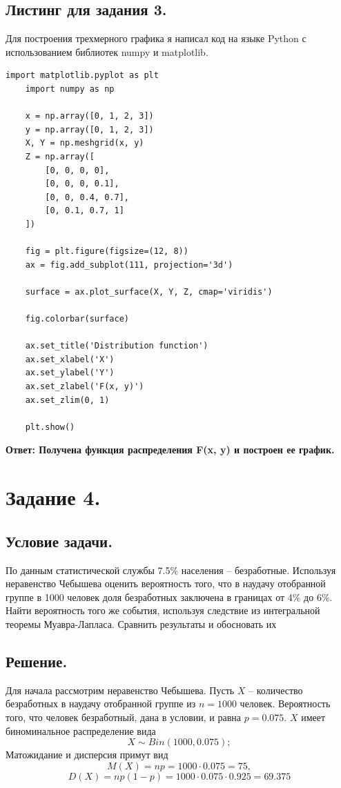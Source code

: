 \documentclass[a4paper, 12pt]{article}
\begin{document}
    \subsection{Листинг для задания 3.}
    Для построения трехмерного графика я написал код на языке Python с использованием библиотек
    numpy и matplotlib.
    \begin{lstlisting}[label=code, caption=Программа для построения трехмерного графика.]
    import matplotlib.pyplot as plt
    import numpy as np

    x = np.array([0, 1, 2, 3])
    y = np.array([0, 1, 2, 3])
    X, Y = np.meshgrid(x, y)
    Z = np.array([
        [0, 0, 0, 0],
        [0, 0, 0, 0.1],
        [0, 0, 0.4, 0.7],
        [0, 0.1, 0.7, 1]
    ])

    fig = plt.figure(figsize=(12, 8))
    ax = fig.add_subplot(111, projection='3d')

    surface = ax.plot_surface(X, Y, Z, cmap='viridis')

    fig.colorbar(surface)

    ax.set_title('Distribution function')
    ax.set_xlabel('X')
    ax.set_ylabel('Y')
    ax.set_zlabel('F(x, y)')
    ax.set_zlim(0, 1)

    plt.show()
    \end{lstlisting}


    \textbf{Ответ: Получена функция распределения F(x, y) и построен ее график.}


    \section{Задание 4.}
    \subsection{Условие задачи.}
    По данным статистической службы 7.5\% населения -- безработные.
    Используя неравенство Чебышева оценить вероятность того, что в
    наудачу отобранной группе в 1000 человек доля безработных заключена
    в границах от 4\% до 6\%. Найти вероятность того же события, используя
    следствие из интегральной теоремы Муавра-Лапласа. Сравнить
    результаты и обосновать их


    \subsection{Решение.}
    Для начала рассмотрим неравенство Чебышева. Пусть $X$ -- количество безработных в наудачу отобранной
    группе из $n=1000$ человек. Вероятность того, что человек безработный, дана в условии, и равна $p=0.075$.
    $X$ имеет биноминальное распределение вида
    $$
    X\sim Bin(1000, 0.075);
    $$
    Матожидание и дисперсия примут вид
    $$
    M(X)=np=1000\cdot0.075=75,
    $$
    $$
    D(X)=np(1-p)=1000\cdot0.075\cdot0.925=69.375
    $$
\end{document}
